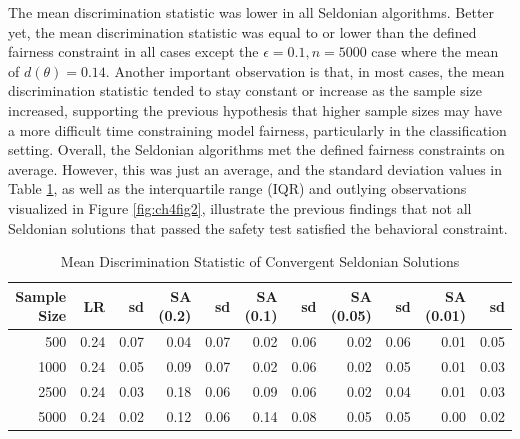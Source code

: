 \documentclass[12pt, twoside]{amherstthesis}
\begin{document}
The mean discrimination statistic was lower in all Seldonian algorithms. Better yet, the mean discrimination statistic was equal to or lower than the defined fairness constraint in all cases except the \(\epsilon = 0.1, n = 5000\) case where the mean of \(d(\theta) = 0.14\). Another important observation is that, in most cases, the mean discrimination statistic tended to stay constant or increase as the sample size increased, supporting the previous hypothesis that higher sample sizes may have a more difficult time constraining model fairness, particularly in the classification setting. Overall, the Seldonian algorithms met the defined fairness constraints on average. However, this was just an average, and the standard deviation values in Table \ref{tab:ch4tab3}, as well as the interquartile range (IQR) and outlying observations visualized in Figure \ref{fig:ch4fig2}, illustrate the previous findings that not all Seldonian solutions that passed the safety test satisfied the behavioral constraint.
\begin{table}

\caption{\label{tab:ch4tab3}Mean Discrimination Statistic of Convergent Seldonian Solutions}
\centering
\begin{tabular}[t]{rrrrrrrrrrr}
\toprule
Sample Size & LR & sd & SA (0.2) & sd  & SA (0.1) & sd   & SA (0.05) & sd    & SA (0.01) & sd     \\
\midrule
500 & 0.24 & 0.07 & 0.04 & 0.07 & 0.02 & 0.06 & 0.02 & 0.06 & 0.01 & 0.05\\
1000 & 0.24 & 0.05 & 0.09 & 0.07 & 0.02 & 0.06 & 0.02 & 0.05 & 0.01 & 0.03\\
2500 & 0.24 & 0.03 & 0.18 & 0.06 & 0.09 & 0.06 & 0.02 & 0.04 & 0.01 & 0.03\\
5000 & 0.24 & 0.02 & 0.12 & 0.06 & 0.14 & 0.08 & 0.05 & 0.05 & 0.00 & 0.02\\
\bottomrule
\end{tabular}
\end{table}
\end{document}
